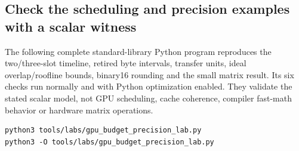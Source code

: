 \subsection{Check the scheduling and precision examples with a scalar witness}\label{03-visual-computing-i-ch016-check-the-scheduling-and-precision-examples-with-a-scalar-witness}

\hypertarget{03-visual-computing-i-ch016-check-the-scheduling-and-precision-examples-with-a-scalar-witness}{}

The following complete standard-library Python program reproduces the two/three-slot timeline, retired byte intervals, transfer units, ideal overlap/roofline bounds, binary16 rounding and the small matrix result. Its six checks run normally and with Python optimization enabled. They validate the stated scalar model, not GPU scheduling, cache coherence, compiler fast-math behavior or hardware matrix operations.

\begin{verbatim}
python3 tools/labs/gpu_budget_precision_lab.py
python3 -O tools/labs/gpu_budget_precision_lab.py
\end{verbatim}


